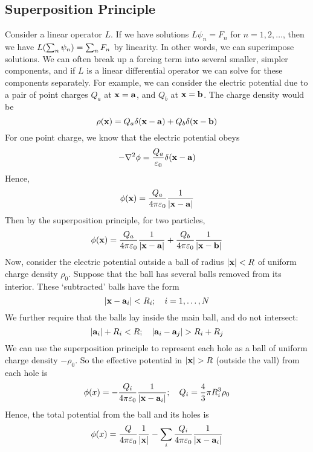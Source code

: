 \subsection{Superposition Principle}
Consider a linear operator \(L\).
If we have solutions \(L \psi_n = F_n\) for \(n = 1, 2, \dots\), then we have \(L\qty(\sum_n \psi_n) = \sum_n F_n\) by linearity.
In other words, we can superimpose solutions.
We can often break up a forcing term into several smaller, simpler components, and if \(L\) is a linear differential operator we can solve for these components separately.
For example, we can consider the electric potential due to a pair of point charges \(Q_a\) at \(\vb x = \vb a\), and \(Q_b\) at \(\vb x = \vb b\).
The charge density would be
\[
	\rho(\vb x) = Q_a \delta(\vb x - \vb a) + Q_b \delta(\vb x - \vb b)
\]
For one point charge, we know that the electric potential obeys
\[
	-\laplacian{\phi} = \frac{Q_a}{\varepsilon_0} \delta(\vb x - \vb a)
\]
Hence,
\[
	\phi(\vb x) = \frac{Q_a}{4\pi \varepsilon_0} \frac{1}{\abs{\vb x - \vb a}}
\]
Then by the superposition principle, for two particles,
\[
	\phi(\vb x) = \frac{Q_a}{4\pi \varepsilon_0} \frac{1}{\abs{\vb x - \vb a}} + \frac{Q_b}{4\pi \varepsilon_0} \frac{1}{\abs{\vb x - \vb b}}
\]
Now, consider the electric potential outside a ball of radius \(\abs{\vb x} < R\) of uniform charge density \(\rho_0\).
Suppose that the ball has several balls removed from its interior.
These `subtracted' balls have the form
\[
	\abs{\vb x - \vb a_i} < R_i;\quad i = 1, \dots, N
\]
We further require that the balls lay inside the main ball, and do not intersect:
\[
	\abs{\vb a_i} + R_i < R;\quad \abs{\vb a_i - \vb a_j} > R_i + R_j
\]
We can use the superposition principle to represent each hole as a ball of uniform charge density \(-\rho_0\).
So the effective potential in \(\abs{\vb x} > R\) (outside the vall) from each hole is
\[
	\phi(x) = -\frac{Q_i}{4\pi\varepsilon_0} \frac{1}{\abs{\vb x - \vb a_i}};\quad Q_i = \frac{4}{3}\pi R_i^3 \rho_0
\]
Hence, the total potential from the ball and its holes is
\[
	\phi(x) = \frac{Q}{4\pi\varepsilon_0} \frac{1}{\abs{\vb x}} - \sum_i\frac{Q_i}{4\pi\varepsilon_0} \frac{1}{\abs{\vb x - \vb a_i}}
\]

